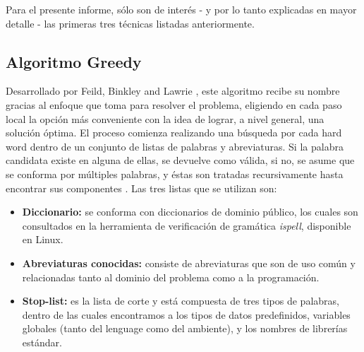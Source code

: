 Para el presente informe, sólo son de interés - y por lo tanto explicadas en mayor detalle - las primeras tres técnicas listadas anteriormente.

\subsection{Algoritmo Greedy}
Desarrollado por Feild, Binkley and Lawrie \cite{FieldBinkleyLawrie06, Feild06anempirical, Lawrie2007, Lawrie:2007:EMA:1306878.1307350, EnslenHillPollock09}, este algoritmo recibe su nombre gracias al enfoque que toma para resolver el problema, eligiendo en cada paso local la opción más conveniente con la idea de lograr, a nivel general, una solución óptima.
El proceso comienza realizando una búsqueda por cada hard word dentro de un conjunto de listas de palabras y abreviaturas.
Si la palabra candidata existe en alguna de ellas, se devuelve como válida, si no, se asume que se conforma por múltiples palabras, y éstas son tratadas recursivamente hasta encontrar sus componentes \cite{Feild06anempirical}.
Las tres listas que se utilizan son:

\begin{itemize}
  \item \textbf{Diccionario:} se conforma con diccionarios de dominio público, los cuales son consultados en la herramienta de verificación de gramática \textit{ispell}, disponible en Linux.
  
  \item \textbf{Abreviaturas conocidas:} consiste de abreviaturas que son de uso común y relacionadas tanto al dominio del problema como a la programación.
  
  \item \textbf{Stop-list:} es la lista de corte y está compuesta de tres tipos de palabras, dentro de las cuales encontramos a los tipos de datos predefinidos, variables globales (tanto del lenguage como del ambiente), y los nombres de librerías estándar.
\end{itemize}

